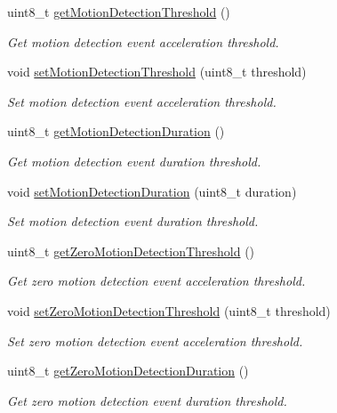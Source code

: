 \begin{DoxyCompactItemize}
uint8\+\_\+t \mbox{\hyperlink{classMPU6050_ab7a825b1b8b86cebda308289630795e7}{get\+Motion\+Detection\+Threshold}} ()
\begin{DoxyCompactList}\small\item\em Get motion detection event acceleration threshold. \end{DoxyCompactList}\item 
void \mbox{\hyperlink{classMPU6050_aa23c8d66502345c30915e69975fd2cc9}{set\+Motion\+Detection\+Threshold}} (uint8\+\_\+t threshold)
\begin{DoxyCompactList}\small\item\em Set motion detection event acceleration threshold. \end{DoxyCompactList}\item 
uint8\+\_\+t \mbox{\hyperlink{classMPU6050_a8ba035c2ae4a05d7e51b0d29e4924fb0}{get\+Motion\+Detection\+Duration}} ()
\begin{DoxyCompactList}\small\item\em Get motion detection event duration threshold. \end{DoxyCompactList}\item 
void \mbox{\hyperlink{classMPU6050_a6d81616aaa47539217057891c91ff08f}{set\+Motion\+Detection\+Duration}} (uint8\+\_\+t duration)
\begin{DoxyCompactList}\small\item\em Set motion detection event duration threshold. \end{DoxyCompactList}\item 
uint8\+\_\+t \mbox{\hyperlink{classMPU6050_ad941c1e844dc9230675c115734599ea3}{get\+Zero\+Motion\+Detection\+Threshold}} ()
\begin{DoxyCompactList}\small\item\em Get zero motion detection event acceleration threshold. \end{DoxyCompactList}\item 
void \mbox{\hyperlink{classMPU6050_a347a51fd25de20b9ead4659015ef793b}{set\+Zero\+Motion\+Detection\+Threshold}} (uint8\+\_\+t threshold)
\begin{DoxyCompactList}\small\item\em Set zero motion detection event acceleration threshold. \end{DoxyCompactList}\item 
uint8\+\_\+t \mbox{\hyperlink{classMPU6050_a04c0fcdcd0157b6dbf74d4901424801e}{get\+Zero\+Motion\+Detection\+Duration}} ()
\begin{DoxyCompactList}\small\item\em Get zero motion detection event duration threshold. \end{DoxyCompactList}\item 

\end{DoxyCompactItemize}
